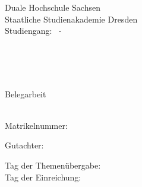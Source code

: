 \begin{titlepage}
    \setcounter{page}{1}
    \begin{minipage}[t]{0.6\textwidth}
        \raggedright
        \small
        Duale Hochschule Sachsen \\
        Staatliche Studienakademie Dresden \\
        Studiengang: \myfos\ - \mycos
    \end{minipage}
    \begin{minipage}[t]{0.35\textwidth}
        \raggedleft
        \small
        {\mycompany \\
        \mystreet \\
        \myplz\ \mylocation}
    \end{minipage}
    
    \vfill
    \vfill
    
    \begin{center}
        \LARGE \textbf{\mytitle}

        \vfill
        
        \large
        
        Belegarbeit 
        \mysemester \\

        \vfill

        \myauthor \\
        \vspace{0.2cm}
        Matrikelnummer: \myimmanr \\

        \vfill

        Gutachter: \myexpert

        \vfill
        \vfill

        \begin{minipage}[t]{0.4\textwidth}
            \raggedright
            Tag der Themenübergabe: \\
            Tag der Einreichung: 
        \end{minipage}%
        \hfill
        \begin{minipage}[t]{0.6\textwidth}
            \raggedright
            \mytsdate \\
            \mysdate
        \end{minipage}
        
    \end{center}
    
\end{titlepage}